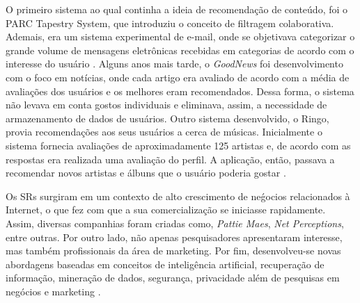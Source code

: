 O primeiro sistema ao qual continha a ideia de recomendação de conteúdo, foi o PARC Tapestry System, que introduziu o conceito de filtragem colaborativa. Ademais, era um sistema experimental de e-mail, onde se objetivava categorizar o grande volume de mensagens eletrônicas recebidas em categorias de acordo com o interesse do usuário \cite{Goldberg1992}.
Alguns anos mais tarde, o \textit{GoodNews} foi desenvolvimento com o foco em notícias, onde cada artigo era avaliado de acordo com a média de avaliações dos usuários e os melhores eram recomendados. Dessa forma, o sistema não levava em conta gostos individuais e eliminava, assim, a necessidade de armazenamento de dados de usuários.
Outro sistema desenvolvido, o Ringo, provia recomendações aos seus usuários a cerca de músicas. Inicialmente o sistema fornecia avaliações de aproximadamente 125 artistas e, de acordo com as respostas era realizada uma avaliação do perfil. A aplicação, então, passava a recomendar novos artistas e álbuns que o usuário poderia gostar \cite{Resnick1994}.


Os SRs surgiram em um contexto de alto crescimento de neǵocios relacionados à Internet,  o que fez com que a sua comercialização se iniciasse rapidamente. Assim, diversas companhias foram criadas como, \textit{Pattie Maes}, \textit{Net Perceptions}, entre outras. Por outro lado, não apenas pesquisadores apresentaram interesse, mas também profissionais da área de marketing. Por fim, desenvolveu-se novas abordagens baseadas em conceitos de inteligência artificial, recuperação de informação, mineração de dados, segurança, privacidade além de pesquisas em negócios e marketing \cite{Jannach2010}.



